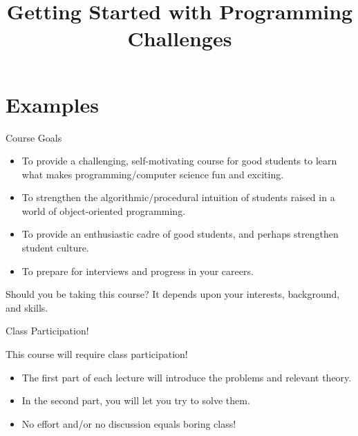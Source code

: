 \documentclass{beamer}
\title[Getting Started with Prog. Challenges]{Getting Started with Programming Challenges}
\begin{document}
\frame{
  \titlepage
}

\section{Examples}


\begin{frame}[fragile]{Course Goals}
  \begin{itemize}
  \item To provide a challenging, self-motivating course for good students to learn what makes programming/computer science fun and exciting.
  \item To strengthen the algorithmic/procedural intuition of students raised in a world of object-oriented programming.
  \item To provide an enthusiastic cadre of good students, and perhaps strengthen student culture.
  \item To prepare for interviews and progress in your careers.
\end{itemize}

\begin{alertblock}{Should you be taking this course?}
  It depends upon your interests, background, and skills.
\end{alertblock}

\end{frame}


\begin{frame}{Class Participation!}
  \begin{alertblock}{This course will require class participation!}
    \begin{itemize}
    \item The first part of each lecture will introduce the problems and relevant theory.
    \item In the second part, you will let you try to solve them.
    \item<alert@1> No effort and/or no discussion equals boring class!
    \end{itemize}
  \end{alertblock}


\end{frame}

\end{document}
